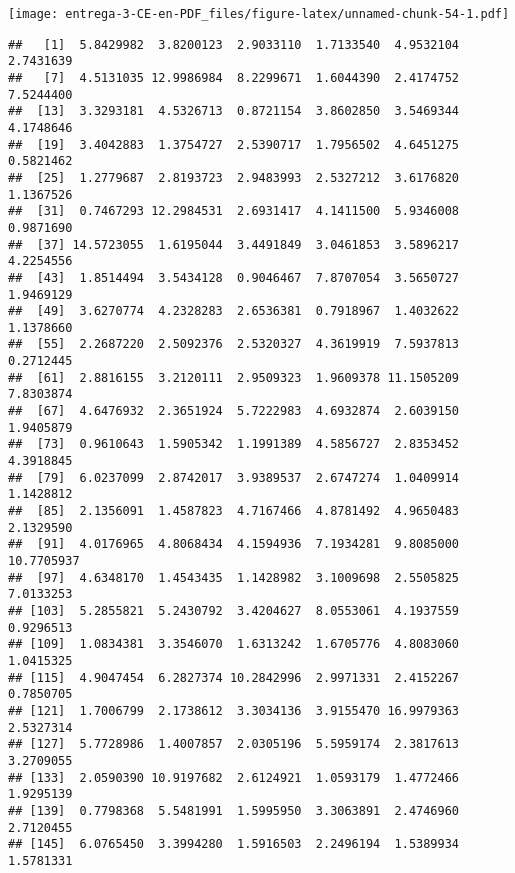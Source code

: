 \documentclass[
]{article}
\newenvironment{Shaded}{\begin{snugshade}}{\end{snugshade}}
\newcommand{\DataTypeTok}[1]{\textcolor[rgb]{0.13,0.29,0.53}{#1}}
\newcommand{\DecValTok}[1]{\textcolor[rgb]{0.00,0.00,0.81}{#1}}
\newcommand{\KeywordTok}[1]{\textcolor[rgb]{0.13,0.29,0.53}{\textbf{#1}}}
\newcommand{\NormalTok}[1]{#1}
\newcommand{\OperatorTok}[1]{\textcolor[rgb]{0.81,0.36,0.00}{\textbf{#1}}}
\newcommand{\StringTok}[1]{\textcolor[rgb]{0.31,0.60,0.02}{#1}}
\begin{document}
\texttt{[image: entrega-3-CE-en-PDF\_files/figure-latex/unnamed-chunk-54-1.pdf]}

\begin{Shaded}
\end{Shaded}

\begin{verbatim}
##   [1]  5.8429982  3.8200123  2.9033110  1.7133540  4.9532104  2.7431639
##   [7]  4.5131035 12.9986984  8.2299671  1.6044390  2.4174752  7.5244400
##  [13]  3.3293181  4.5326713  0.8721154  3.8602850  3.5469344  4.1748646
##  [19]  3.4042883  1.3754727  2.5390717  1.7956502  4.6451275  0.5821462
##  [25]  1.2779687  2.8193723  2.9483993  2.5327212  3.6176820  1.1367526
##  [31]  0.7467293 12.2984531  2.6931417  4.1411500  5.9346008  0.9871690
##  [37] 14.5723055  1.6195044  3.4491849  3.0461853  3.5896217  4.2254556
##  [43]  1.8514494  3.5434128  0.9046467  7.8707054  3.5650727  1.9469129
##  [49]  3.6270774  4.2328283  2.6536381  0.7918967  1.4032622  1.1378660
##  [55]  2.2687220  2.5092376  2.5320327  4.3619919  7.5937813  0.2712445
##  [61]  2.8816155  3.2120111  2.9509323  1.9609378 11.1505209  7.8303874
##  [67]  4.6476932  2.3651924  5.7222983  4.6932874  2.6039150  1.9405879
##  [73]  0.9610643  1.5905342  1.1991389  4.5856727  2.8353452  4.3918845
##  [79]  6.0237099  2.8742017  3.9389537  2.6747274  1.0409914  1.1428812
##  [85]  2.1356091  1.4587823  4.7167466  4.8781492  4.9650483  2.1329590
##  [91]  4.0176965  4.8068434  4.1594936  7.1934281  9.8085000 10.7705937
##  [97]  4.6348170  1.4543435  1.1428982  3.1009698  2.5505825  7.0133253
## [103]  5.2855821  5.2430792  3.4204627  8.0553061  4.1937559  0.9296513
## [109]  1.0834381  3.3546070  1.6313242  1.6705776  4.8083060  1.0415325
## [115]  4.9047454  6.2827374 10.2842996  2.9971331  2.4152267  0.7850705
## [121]  1.7006799  2.1738612  3.3034136  3.9155470 16.9979363  2.5327314
## [127]  5.7728986  1.4007857  2.0305196  5.5959174  2.3817613  3.2709055
## [133]  2.0590390 10.9197682  2.6124921  1.0593179  1.4772466  1.9295139
## [139]  0.7798368  5.5481991  1.5995950  3.3063891  2.4746960  2.7120455
## [145]  6.0765450  3.3994280  1.5916503  2.2496194  1.5389934  1.5781331

\end{verbatim}
\end{document}
